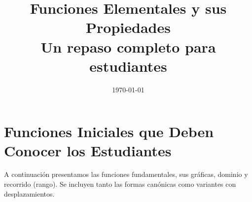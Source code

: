 \documentclass[12pt,a4paper]{article}
\begin{document}
\title{\textbf{Funciones Elementales y sus Propiedades}\\ \Large Un repaso completo para estudiantes}
\author{}
\date{\today}
\maketitle

\tableofcontents
\newpage

\section{Funciones Iniciales que Deben Conocer los Estudiantes}

A continuación presentamos las funciones fundamentales, sus gráficas, dominio y recorrido (rango). Se incluyen tanto las formas canónicas como variantes con desplazamientos.

\end{document}
